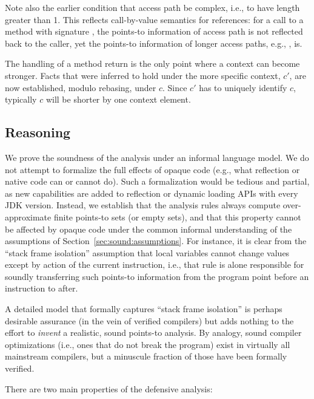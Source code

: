 Note also the earlier condition that access path  be complex, i.e., to have length greater than 1. This reflects call-by-value semantics for references: for a call  to a method with signature , the points-to information of access path  is not reflected back to the caller, yet the points-to information of longer access paths, e.g., , is.

The handling of a method return is the only point where a context can become stronger. Facts that were inferred to hold under the more specific context, $c'$, are now established, modulo rebasing, under $c$. Since $c'$ has to uniquely identify $c$, typically $c$ will be shorter by one context element.


\subsection{Reasoning}
\label{sec:sound:reasoning}

We prove the soundness of the analysis under an informal language model. We do not attempt to formalize the full effects of opaque code (e.g., what reflection or native code can or cannot do). Such a formalization would be tedious and partial, as new capabilities are added to reflection or dynamic loading APIs with every JDK version. Instead, we establish that the analysis rules always compute over-approximate finite points-to sets (or empty sets), and that this property cannot be affected by opaque code under the common informal understanding of the assumptions of Section~\ref{sec:sound:assumptions}. For instance, it is clear from the ``stack frame isolation'' assumption that local variables cannot change values except by action of the current instruction, i.e., that rule  is alone responsible for soundly transferring such points-to information from the program point before an instruction to after.

A detailed model that formally captures ``stack frame isolation'' is perhaps desirable assurance (in the vein of verified compilers) but adds nothing to the effort to \emph{invent} a realistic, sound points-to analysis. By analogy, sound compiler optimizations (i.e., ones that do not break the program) exist in virtually all mainstream compilers, but a minuscule fraction of those have been formally verified.

There are two main properties of the defensive analysis: 

